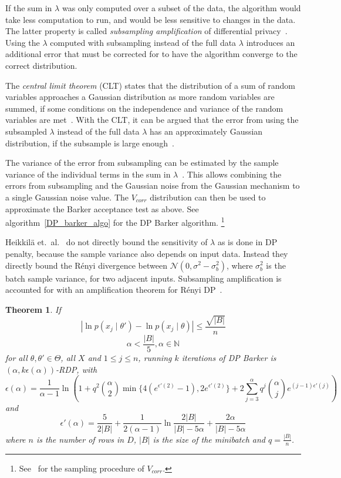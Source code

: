 \documentclass[english,twoside,openright]{HYgraduMLDS}
\newtheorem{theorem}{Theorem}
\newcommand{\N}{\mathbb{N}}
\newcommand{\caln}{{\mathcal{N}}}
\begin{document}
If the sum in \(\lambda\) was only computed over a subset of the data, the 
algorithm would take less computation to run, and would be less sensitive 
to changes in the data. The latter property is called \emph{subsampling amplification}
of differential privacy~\cite{WangBK19}. Using the \(\lambda\) computed 
with subsampling instead of the full data \(\lambda\) introduces an additional 
error that must be corrected for to have the algorithm converge to the correct 
distribution. 

The \emph{central limit theorem} (CLT) states that the distribution of a sum 
of random variables approaches a Gaussian distribution as more random variables 
are summed, if some conditions on the independence and variance of the random 
variables are met~\cite{HeikkilaJDH19}. With the CLT, it can be argued 
that the error from 
using the subsampled \(\lambda\) instead of the full data \(\lambda\) has an 
approximately Gaussian distribution, if the subsample is large 
enough~\cite{HeikkilaJDH19}. 

The variance of the error from subsampling can 
be estimated by the sample variance of the individual terms in the sum in 
\(\lambda\)~\cite{HeikkilaJDH19}. This allows combining the errors from subsampling and the 
Gaussian noise from the Gaussian mechanism to a single Gaussian noise value.
The \(V_{corr}\) distribution can then be used to approximate the Barker acceptance 
test as above. See algorithm~\ref{DP_barker_algo} for the DP Barker algorithm.
\footnote{
    See~\cite{HeikkilaJDH19} for the sampling procedure of \(V_{corr}\).
}

Heikkilä et.\ al.~\cite{HeikkilaJDH19} do not directly bound the sensitivity 
of \(\lambda\) as is done in DP penalty, because the sample variance also 
depends on input data. Instead they directly bound the Rényi divergence 
between \(\caln(0, \sigma^2 - \sigma^2_b)\), where \(\sigma^2_b\) is the 
batch sample variance, for two adjacent inputs. Subsampling amplification 
is accounted for with an amplification theorem for Rényi DP~\cite{WangBK19}.

\begin{theorem}\label{dp_barker_theorem}
    If 
    \[
        |\ln p(x_j\mid \theta') - \ln p(x_j\mid \theta)| \leq \frac{\sqrt{|B|}}{n}
    \]
    \[
        \alpha < \frac{|B|}{5}, \alpha \in \N
    \]
    for all \(\theta, \theta' \in \Theta\), all \(X\) and \(1\leq j \leq n\),
    running \(k\) iterations of DP Barker is \((\alpha, k\epsilon(\alpha))\)-RDP, 
    with 
    \[
        \epsilon(\alpha) = \frac{1}{\alpha - 1}\ln \left(
        1 + q^2\binom{\alpha}{2}\min\{4(e^{\epsilon'(2)} - 1), 2e^{\epsilon'(2)}\}
        + 2 \sum_{j=3}^\alpha q^j\binom{\alpha}{j}e^{(j-1)\epsilon'(j)}\right)
    \]
    and 
    \[
        \epsilon'(\alpha) = \frac{5}{2|B|} + \frac{1}{2(\alpha - 1)}
        \ln \frac{2|B|}{|B| - 5\alpha} + \frac{2\alpha}{|B| - 5\alpha}
    \]
    where \(n\) is the number of rows in \(D\), \(|B|\) is the size of the 
    minibatch and \(q = \frac{|B|}{n}\).
\end{theorem}
\end{document}
